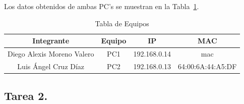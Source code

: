         Los datos obtenidos de ambas PC's se muestran en la Tabla~\ref{tab:tabla_equipos}.

        \begin{table}[H]
            \centering
            \begin{tabular}{c|c|c|c}
                \textbf{Integrante} & \textbf{Equipo} & \textbf{IP} & \textbf{MAC} \\
                \hline
                Diego Alexis Moreno Valero & PC1 & 192.168.0.14 & mac \\
                Luis Ángel Cruz Díaz & PC2 & 192.168.0.13 & 64:00:6A:44:A5:DF \\
            \end{tabular}
            \caption{Tabla de Equipos}
            \label{tab:tabla_equipos}
        \end{table}
    \subsection{Tarea 2.}

